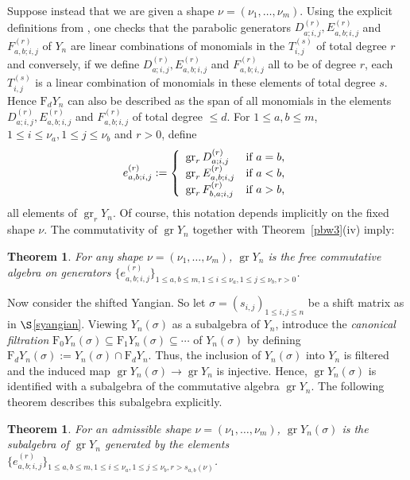 \documentclass[twoside,12pt,reqno]{amsart}
\newtheorem{Theorem}[Proposition]{Theorem}
\def\F{\mathrm{F}}
\def\gr{\operatorname{gr}}
\begin{document}
Suppose instead that we are given a shape
$\nu = (\nu_1,\dots,\nu_m)$.
Using the explicit definitions from 
\cite[(6.1)--(6.4)]{BK}, one checks
that the parabolic generators
$D_{a;i,j}^{(r)}, E_{a,b;i,j}^{(r)}$
and $F_{a,b;i,j}^{(r)}$ of $Y_n$ are linear combinations of monomials
in the $T_{i,j}^{(s)}$ of total degree $r$ and 
conversely, if we define
$D_{a;i,j}^{(r)}, E_{a,b;i,j}^{(r)}$
and $F_{a,b;i,j}^{(r)}$ all to be of degree $r$, each $T_{i,j}^{(s)}$
is a linear combination of monomials in these elements
of total degree $s$.
Hence $\F_d Y_n$ can also be described as the span of all monomials
in the elements
$D_{a;i,j}^{(r)}, E_{a,b;i,j}^{(r)}$
and $F_{a,b;i,j}^{(r)}$ of total degree $\leq d$.
For $1 \leq a,b \leq m$,
$1 \leq i \leq \nu_a, 1 \leq j \leq \nu_b$ and $r > 0$, define
\begin{equation}\label{eelts}
e_{a,b;i,j}^{(r)} := \left\{
\begin{array}{ll}
\gr_r D_{a;i,j}^{(r)}&\hbox{if $a=b$,}\\
\gr_r E_{a,b;i,j}^{(r)}&\hbox{if $a < b$,}\\
\gr_r F_{b,a;i,j}^{(r)}&\hbox{if $a > b$,}
\end{array}
\right.
\end{equation}
all elements of $\gr_r Y_{n}$.
Of course, this notation depends implicitly on the fixed shape $\nu$.
The commutativity of $\gr Y_n$ together with
Theorem~\ref{pbw3}(iv) imply:

\begin{Theorem} \label{assgr1}
For any shape $\nu = (\nu_1,\dots,\nu_m)$,
$\gr Y_n$ is the free commutative algebra on generators
$\{e_{a,b;i,j}^{(r)}\}_{1 \leq a, b \leq m,
1 \leq i \leq \nu_a, 1 \leq j \leq \nu_b, r > 0}$.
\end{Theorem}

Now consider the shifted Yangian. So let $\sigma = (s_{i,j})_{1 \leq i,j \leq n}$ be a shift matrix as in $\S$\ref{syangian}.
Viewing $Y_n(\sigma)$ as a subalgebra
of $Y_n$, introduce the {\em canonical filtration} 
$\F_0 Y_n(\sigma)\subseteq \F_1 Y_n(\sigma) \subseteq \cdots$
of $Y_n(\sigma)$ by defining
$\F_d Y_n(\sigma) := Y_n(\sigma) \cap \F_d Y_n$.
Thus, the inclusion of $Y_n(\sigma)$ into $Y_n$ is filtered and the induced
map $\gr Y_n(\sigma) \rightarrow \gr Y_n$ is injective. Hence, 
$\gr Y_n(\sigma)$ is identified with a subalgebra of the commutative
algebra $\gr Y_n$. The following theorem describes this subalgebra
explicitly.


\begin{Theorem} \label{assgr2}
For an admissible shape 
$\nu = (\nu_1,\dots,\nu_m)$,
$\gr Y_n(\sigma)$ is the 
subalgebra of $\gr Y_n$
generated by the elements
$\{e_{a,b;i,j}^{(r)}\}_{1 \leq a, b \leq m,
1 \leq i \leq \nu_a, 1 \leq j \leq \nu_b, r > s_{a,b}(\nu)}$.
\end{Theorem}
\end{document}
